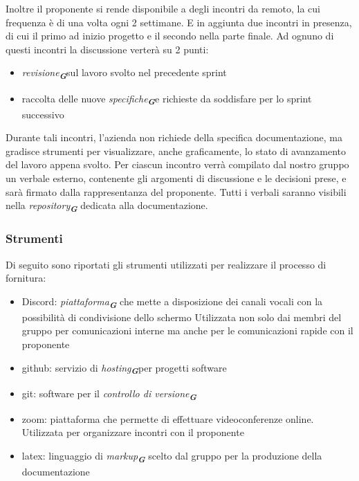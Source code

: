 Inoltre il proponente si rende disponibile a degli incontri da remoto, la cui frequenza è di una volta ogni 2 settimane.
E in aggiunta due incontri in presenza, di cui il primo ad inizio progetto e il secondo nella parte finale.
Ad ognuno di questi incontri la discussione verterà su 2 punti:
\begin{itemize}
\item \emph{revisione}\textsubscript{\textit{\textbf{G}}}sul lavoro svolto nel precedente sprint
\item raccolta delle nuove \emph{specifiche}\textsubscript{\textit{\textbf{G}}}e richieste da soddisfare per lo sprint successivo
\end{itemize}
Durante tali incontri, l’azienda non richiede della specifica documentazione, ma gradisce strumenti per visualizzare, anche graficamente, lo stato di avanzamento del lavoro appena svolto.
Per ciascun incontro verrà compilato dal nostro gruppo un verbale esterno, contenente gli argomenti di discussione e le decisioni prese, e sarà firmato dalla rappresentanza del proponente.
Tutti i verbali saranno visibili nella \emph{repository}\textsubscript{\textit{\textbf{G}}} dedicata alla documentazione.

\subsubsection{Strumenti}

Di seguito sono riportati gli strumenti utilizzati per realizzare il processo di fornitura:
\begin{itemize}
\item Discord: \emph{piattaforma}\textsubscript{\textit{\textbf{G}}} che mette a disposizione dei canali vocali con la possibilità di condivisione dello schermo
Utilizzata non solo dai membri del gruppo per comunicazioni interne ma anche per le comunicazioni rapide con il proponente
\item github: servizio di \emph{hosting}\textsubscript{\textit{\textbf{G}}}per progetti software
\item git: software per il \emph{controllo di versione}\textsubscript{\textit{\textbf{G}}}
\item zoom: piattaforma che permette di effettuare videoconferenze online. Utilizzata per organizzare incontri con il proponente
\item latex: linguaggio di \emph{markup}\textsubscript{\textit{\textbf{G}}} scelto dal gruppo per la produzione della documentazione
\end{itemize}

